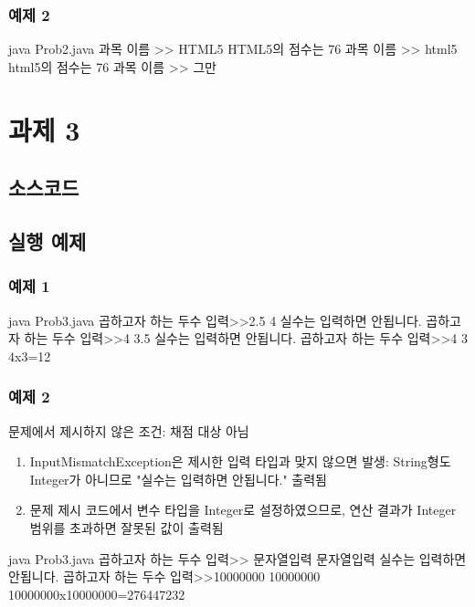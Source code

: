 \documentclass{article}
\theoremstyle{nonumberplain}
\begin{document}
\subsubsection{예제 2}
\begin{console}
java Prob2.java
과목 이름 >> HTML5
HTML5의 점수는 76
과목 이름 >> html5
html5의 점수는 76
과목 이름 >> 그만
\end{console}



\section{과제 3}
\subsection{소스코드}

\subsection{실행 예제}
\subsubsection{예제 1}
\begin{console}
java Prob3.java
곱하고자 하는 두수 입력>>2.5 4
실수는 입력하면 안됩니다.
곱하고자 하는 두수 입력>>4 3.5
실수는 입력하면 안됩니다.
곱하고자 하는 두수 입력>>4 3
4x3=12
\end{console}
\subsubsection{예제 2}
문제에서 제시하지 않은 조건: 채점 대상 아님
\begin{enumerate}
  \item InputMismatchException은 제시한 입력 타입과 맞지 않으면 발생: String형도 Integer가 아니므로 "실수는 입력하면 안됩니다." 출력됨
  \item 문제 제시 코드에서 변수 타입을 Integer로 설정하였으므로, 연산 결과가 Integer 범위를 초과하면 잘못된 값이 출력됨
\end{enumerate}
\begin{console}
java Prob3.java
곱하고자 하는 두수 입력>> 문자열입력 문자열입력
실수는 입력하면 안됩니다.
곱하고자 하는 두수 입력>>10000000 10000000
10000000x10000000=276447232
\end{console}
\end{document}
